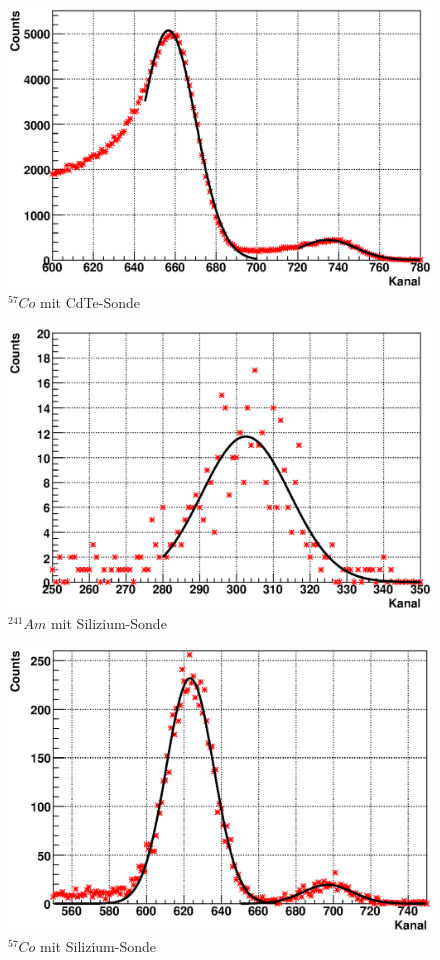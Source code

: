 \documentclass[12pt]{article}
\begin{document}
\begin{figure}[H]
\centering
\includegraphics[width=0.9\linewidth]{../plot/eps/gamma/cdte_co.eps}
\caption{$^{57}Co$ mit CdTe-Sonde}
\end{figure}

\begin{figure}[H]
\centering
\includegraphics[width=0.9\linewidth]{../plot/eps/gamma/si_am.eps}
\caption{$^{241}Am$ mit Silizium-Sonde}
\end{figure}

\begin{figure}[H]
\centering
\includegraphics[width=0.9\linewidth]{../plot/eps/gamma/si_co.eps}
\caption{$^{57}Co$ mit Silizium-Sonde}
\end{figure}
\end{document}
